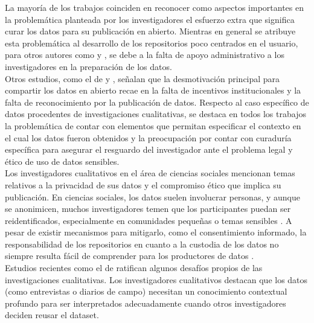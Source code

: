 \documentclass[runningheads]{llncs}
\def \bchgon {\begin{color}{blue}}
\def \echgon {\end{color}}
\def \bchedel {\begin{color}{cyan}}
\def \echedel {\end{color}}
\begin{document}
La mayoría de los trabajos coinciden en reconocer como aspectos importantes en la problemática planteada por los investigadores el esfuerzo extra que significa curar los datos para su publicación en abierto.  Mientras en general se atribuye esta problemática al desarrollo de los repositorios poco centrados en el usuario, para otros autores como \citet{borycz2023} y \citet{casali2022open}, se debe a la falta de apoyo administrativo a los investigadores en la preparación de los datos.\\

Otros estudios, como el de \citet{grattarola2024gaps} y \citet{ mabile2025recommendations}, señalan que la desmotivación principal para compartir los datos en abierto  recae en la falta de incentivos institucionales y la falta de reconocimiento por la publicación de datos.
Respecto al caso específico de datos procedentes de investigaciones cualitativas, se destaca en todos los trabajos la problemática de contar con elementos que permitan especificar el contexto en el cual los datos fueron obtenidos y la preocupación por contar con curaduría específica para asegurar el resguardo del investigador ante el problema legal y ético de uso de datos sensibles.\\

Los investigadores cualitativos en el área de ciencias sociales mencionan temas relativos a la privacidad de sus datos y el compromiso ético que implica su publicación. En ciencias sociales, los datos suelen involucrar personas, y aunque se anonimicen, muchos investigadores temen que los participantes puedan ser reidentificados, especialmente en comunidades pequeñas o temas sensibles \citep{kraehmer2023}. A pesar de existir mecanismos para mitigarlo, como el consentimiento informado, la responsabilidad de los repositorios en cuanto a la custodia de los datos no siempre resulta fácil de comprender para los productores de datos \citep{prosser2022}.\\

Estudios recientes como el de \cite{Lamb2024} ratifican algunos desafíos propios de las investigaciones cualitativas. Los investigadores cualitativos destacan que los datos (como entrevistas o diarios de campo) necesitan un conocimiento contextual profundo para ser interpretados adecuadamente cuando otros investigadores deciden reusar el dataset. \\

\end{document}
